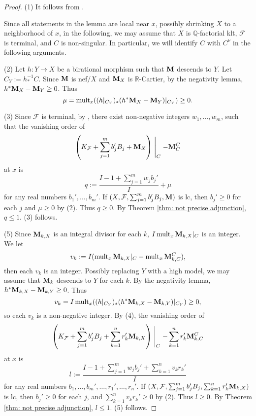 \documentclass[11pt]{amsart}
\numberwithin{equation}{section}
\newcommand{\Mm}{{\bf{M}}}
\newcommand{\Qq}{\mathbb{Q}}
\newcommand{\Rr}{\mathbb{R}}
\newcommand{\mult}{\operatorname{mult}}
\newcommand{\Ff}{\mathcal{F}}
\theoremstyle{definition}
\theoremstyle{definition}
\theoremstyle{definition}
\begin{document}
\begin{proof}
    (1) It follows from \cite[Theorem 3.19]{LMX23a}.

    Since all statements in the lemma are local near $x$, possibly shrinking $X$ to a neighborhood of $x$, in the following, we may assume that $X$ is $\Qq$-factorial klt, $\Ff$ is terminal, and $C$ is non-singular. In particular, we will identify $C$ with $C^\nu$ in the following arguments.
    
    (2) Let $h: Y\rightarrow X$ be a birational morphism such that $\Mm$ descends to $Y$. Let $C_Y:=h^{-1}_*C$. Since $\Mm$ is nef$/X$ and $\Mm_X$ is $\Rr$-Cartier, by the negativity lemma, $h^*\Mm_X-\Mm_Y\geq 0$. Thus
    $$\mu=\mult_x((h|_{C_Y})_*(h^*\Mm_X-\Mm_Y)|_{C_Y})\geq 0.$$
    
    (3) Since $\Ff$ is terminal, by \cite[Theorem 3.2]{LMX23b}, there exist non-negative integers $w_1,\dots,w_m$, such that the vanishing order of $$\left(K_{\Ff}+\sum_{j=1}^mb_j'B_j+\Mm_X\right)\Biggm|_{C}-\Mm^C_{C}$$
        at $x$ is 
        $$q:=\frac{I-1+\sum_{j=1}^mw_jb_j'}{I}+\mu$$
        for any real numbers $b_1',\dots,b_m'$. If $(X,\Ff,\sum_{j=1}^mb_j'B_j,\Mm)$ is lc, then $b_j'\geq 0$ for each $j$ 
 and $\mu\geq 0$ by (2). Thus $q\geq 0$. By Theorem \ref{thm: not precise adjunction}, $q\leq 1$. (3) follows.

 (5) Since $\Mm_{k,X}$ is an integral divisor for each $k$, $I\mult_x\Mm_{k,X}|_C$ is an integer. We let
 $$v_k:=I(\mult_x\Mm_{k,X}|_C-\mult_x\Mm_{k,C}^C),$$
 then each $v_k$ is an integer. Possibly replacing $Y$ with a high model, we may assume that $\Mm_k$ descends to $Y$ for each $k$. By the negativity lemma, $h^*\Mm_{k,X}-\Mm_{k,Y}\geq 0$. Thus
    $$v_k=I\mult_x((h|_{C_Y})_*(h^*\Mm_{k,X}-\Mm_{k,Y})|_{C_Y})\geq 0,$$
 so each $v_k$ is a non-negative integer. By (4), the vanishing order of
$$\left(K_{\Ff}+\sum_{j=1}^mb_j'B_j+\sum_{k=1}^nr_k'\Mm_{k,X}\right)\Biggm|_{C}-\sum_{k=1}^nr_k'\Mm_{k,C}^C$$
at $x$ is
$$l:=\frac{I-1+\sum_{j=1}^mw_jb_j'+\sum_{k=1}^nv_kr_k'}{I}$$
for any real numbers $b_1,\dots,b_m',\dots,r_1',\dots,r_n'$.
 If $(X,\Ff,\sum_{j=1}^mb_j'B_j,\sum_{k=1}^nr_k'\Mm_{k,X})$ is lc, then $b_j'\geq 0$ for each $j$, and $\sum_{k=1}^nv_kr_k'\geq 0$ by (2). Thus $l\geq 0$. By Theorem \ref{thm: not precise adjunction}, $l\leq 1$. (5) follows.
\end{proof}
\end{document}
